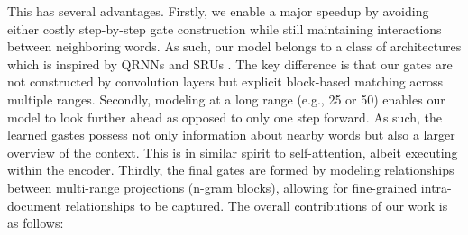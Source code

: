 \documentclass{article}
\begin{document}
This has several advantages. Firstly, we enable a major speedup by avoiding either costly step-by-step gate construction while still maintaining interactions between neighboring words. As such, our model belongs to a class of architectures which is inspired by QRNNs \cite{DBLP:journals/corr/BradburyMXS16} and SRUs \cite{lei2017training}. The key difference is that our gates are not constructed by convolution layers but explicit block-based matching across multiple ranges. Secondly, modeling at a long range (e.g., 25 or 50) enables our model to look further ahead as opposed to only one step forward. As such, the learned gastes possess not only information about nearby words but also a larger overview of the context. This is in similar spirit to self-attention, albeit executing within the encoder. Thirdly, the final gates are formed by modeling relationships between multi-range projections (n-gram blocks), allowing for fine-grained intra-document relationships to be captured. The overall contributions of our work is as follows:
\end{document}
